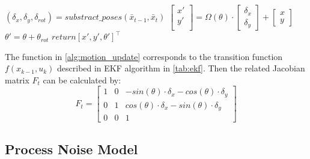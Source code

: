 \begin{algorithm}                      
  \caption{\transfunc ($x_{t-1}$, $u_t$)}         %
  \label{alg:motion_update}                           
  \begin{algorithmic}[1]                    
    \State $(\delta_{x}, \delta_{y}, \delta_{rot}) = substract\_poses (\bar{x}_{t-1}, \bar{x}_{t})$
    \State $
    \begin{bmatrix}
      x'\\ 
      y'\\ 
    \end{bmatrix}
    = 
    \Omega(\theta)
    \cdot 
    \begin{bmatrix}
      \delta_{x}\\ 
      \delta_{y} 
    \end{bmatrix} +
    \begin{bmatrix}
      x\\ 
      y 
    \end{bmatrix}\
    $
    \State $\theta' = \theta + \theta_{rot}$ 
    \State $return [x', y', \theta']^\top$
  \end{algorithmic}
\end{algorithm}

The function \textit{\transfunc} in \autoref{alg:motion_update} corresponds to the transition function $f(x_{k-1}, u_{k})$ described in \gls{EKF} algorithm in \autoref{tab:ekf}. Then the related Jacobian matrix $F_t$ can be calculated by:
\begin{equation}\label{eq:jacobianF} 
F_t = 
\begin{bmatrix}
1 & 0 & -sin(\theta)\cdot \delta_x - cos(\theta)\cdot\delta_y\\ 
0 &  1& cos(\theta)\cdot \delta_x  - sin(\theta)\cdot\delta_y\\ 
0 & 0 & 1
\end{bmatrix} 
\end{equation}

\subsection{Process Noise Model}
\label{sub:Process Noise Model}

